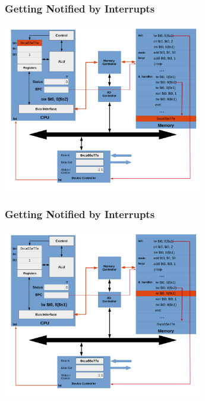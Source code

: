 \documentclass{beamer}
\begin{document}
\begin{frame}[fragile]
\frametitle{Getting Notified by Interrupts}

\begin{center}
\vspace*{-0.23cm}
\hspace*{-1cm}\includegraphics[width=8.7cm]{interrupt_waiting18.pdf}
\end{center}

\end{frame}

\begin{frame}[fragile]
\frametitle{Getting Notified by Interrupts}

\begin{center}
\vspace*{-0.23cm}
\hspace*{-1cm}\includegraphics[width=8.7cm]{interrupt_waiting19.pdf}
\end{center}

\end{frame}
\end{document}
